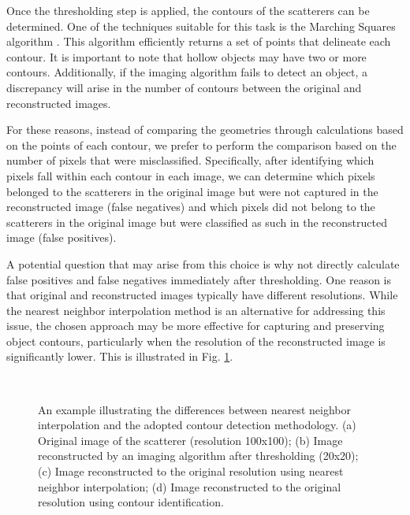 \documentclass{IEEEtran}
\begin{document}
			Once the thresholding step is applied, the contours of the scatterers can be determined. One of the techniques suitable for this task is the Marching Squares algorithm \cite{lorensen1987marching}. This algorithm efficiently returns a set of points that delineate each contour. It is important to note that hollow objects may have two or more contours. Additionally, if the imaging algorithm fails to detect an object, a discrepancy will arise in the number of contours between the original and reconstructed images.
			
			For these reasons, instead of comparing the geometries through calculations based on the points of each contour, we prefer to perform the comparison based on the number of pixels that were misclassified. Specifically, after identifying which pixels fall within each contour in each image, we can determine which pixels belonged to the scatterers in the original image but were not captured in the reconstructed image (false negatives) and which pixels did not belong to the scatterers in the original image but were classified as such in the reconstructed image (false positives).
			
			A potential question that may arise from this choice is why not directly calculate false positives and false negatives immediately after thresholding. One reason is that original and reconstructed images typically have different resolutions. While the nearest neighbor interpolation method is an alternative for addressing this issue, the chosen approach may be more effective for capturing and preserving object contours, particularly when the resolution of the reconstructed image is significantly lower. This is illustrated in Fig. \ref{fig:contourmotivation}.
			
			\begin{figure}[!t]
				\centering
				 \\
				\caption{An example illustrating the differences between nearest neighbor interpolation and the adopted contour detection methodology. (a) Original image of the scatterer (resolution 100x100); (b) Image reconstructed by an imaging algorithm after thresholding (20x20); (c) Image reconstructed to the original resolution using nearest neighbor interpolation; (d) Image reconstructed to the original resolution using contour identification.}
				\label{fig:contourmotivation}
			\end{figure}
\end{document}
